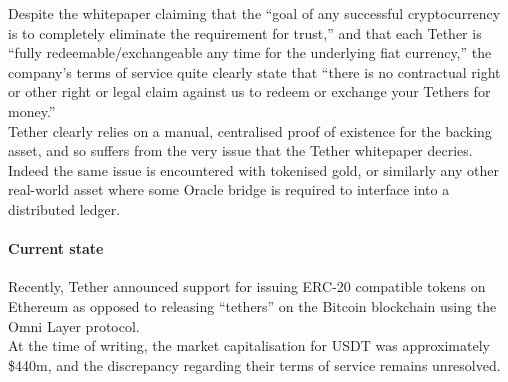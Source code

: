Despite the whitepaper claiming that the ``goal of any successful cryptocurrency is to completely eliminate the requirement for trust,'' and that each Tether is ``fully redeemable/exchangeable any time for the underlying fiat currency,'' the company's terms of service quite clearly state that ``there is no contractual right or other right or legal claim against us to redeem or exchange your Tethers for money.'' \\

\noindent Tether clearly relies on a manual, centralised proof of existence for the backing asset, and so suffers from the very issue that the Tether whitepaper decries. Indeed the same issue is encountered with tokenised gold, or similarly any other real-world asset where some Oracle bridge is required to interface into a distributed ledger.

\paragraph{Current state}

Recently, Tether announced support for issuing ERC-20 compatible tokens on Ethereum as opposed to releasing ``tethers'' on the Bitcoin blockchain using the Omni Layer protocol. \\

\noindent At the time of writing, the market capitalisation for USDT was approximately \$440m, and the discrepancy regarding their terms of service remains unresolved. \\









\pagebreak